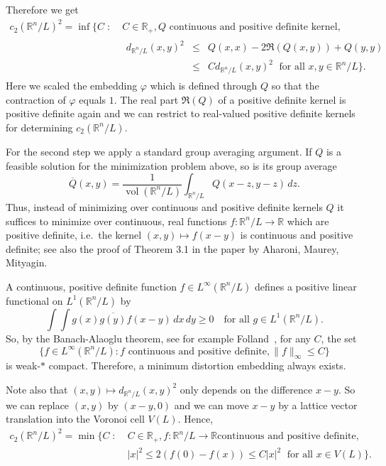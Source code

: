 \documentclass{amsart}
\newcommand{\R}{\mathbb{R}}
\DeclareMathOperator{\vol}{vol}
\begin{document}
Therefore we get
\[
  \begin{split}
  c_2(\R^n/L)^2 = \inf\{C \; : \; & C \in \R_+, Q \text{ continuous and positive definite kernel},\\
  &  \begin{array}{rcl} d_{\R^n/L}(x,y)^2 & \leq &  Q(x,x) - 2 \Re(Q(x,y)) + Q(y,y) \\
        & \leq & C d_{\R^n/L}(x,y)^2 \; \text{ for all } x,y \in \R^n/L\}.
   \end{array}
  \end{split}
\]
Here we scaled the embedding $\varphi$ which is defined through $Q$ so
that the contraction of $\varphi$ equals $1$. The real part $\Re(Q)$
of a positive definite kernel is positive definite again and we can
restrict to real-valued positive
definite kernels for determining $c_2(\R^n/L)$.

For the second step we apply a standard group averaging argument. If
$Q$ is a feasible solution for the minimization problem above, so is
its group average
\[
  \overline{Q}(x,y) = \frac{1}{\vol(\R^n/L)} \int_{\R^n/L} Q(x-z, y-z)
  \, dz.
\]
Thus, instead of minimizing over
continuous and positive definite kernels $Q$ it suffices to minimize over continuous,
real functions $f \colon \R^n/L \to \R$ which are positive definite,
i.e.\ the kernel $(x,y) \mapsto f(x - y)$ is continuous and positive definite; see
also the proof of Theorem 3.1 in the paper \cite{Aharoni1985a} by
Aharoni, Maurey, Mityagin.


A continuous, positive definite function $f \in L^{\infty}(\R^n/L)$ defines a positive linear functional on $L^1(\R^n/L)$ by
\[
\int\int g(x) \overline{g(y)} f(x-y) \, dx \, dy \geq 0 \quad \text{for all } g \in L^1(\R^n/L). 
\]
So, by the Banach-Alaoglu theorem, see for example Folland~\cite[Chapter 3.3]{Folland1995a}, 
for any $C$, the set 
\[
\{f \in L^{\infty}(\R^n/L) : f \text{ continuous and positive definite}, \|f\|_{\infty} \leq C\}
\]
is weak-$*$ compact. Therefore, a minimum distortion embedding always exists.

Note also that $(x,y) \mapsto d_{\R^n/L}(x,y)^2$ only depends on the
difference $x-y$. So we can replace $(x,y)$ by $(x-y,0)$ and we can
move $x-y$ by a lattice vector translation into the Voronoi cell
$V(L)$. Hence,
\[
  \begin{split}
  c_2(\R^n/L)^2 = \min\{C \; : \; & C \in \R_+, f \colon \R^n/L \to \R \text{
    continuous and positive definite},\\
&  |x|^2 \leq 2(f(0) - f(x)) \leq C
|x|^2 \; \text{ for all } x \in V(L)\}.
  \end{split}
\]
\end{document}

